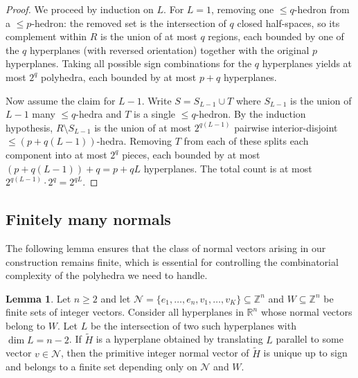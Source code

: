\documentclass{amsart}
\theoremstyle{definition}
\newtheorem{lemma}[theorem]{Lemma}
\begin{document}
\begin{proof}
We proceed by induction on $L$. For $L=1$, removing one $\leq\!\! q$-hedron
from a $\leq\!\! p$-hedron: the removed set is the intersection of $q$ closed
half-spaces, so its complement within $R$ is the union of at most $q$
regions, each bounded by one of the $q$ hyperplanes (with reversed
orientation) together with the original $p$ hyperplanes. Taking all
possible sign combinations for the $q$ hyperplanes yields at most $2^q$
polyhedra, each bounded by at most $p+q$ hyperplanes.

Now assume the claim for $L-1$. Write $S=S_{L-1}\cup T$ where $S_{L-1}$
is the union of $L-1$ many $\leq\!\! q$-hedra and $T$ is a single
$\leq\!\! q$-hedron. By the induction hypothesis, $R\setminus S_{L-1}$ is the
union of at most $2^{q(L-1)}$ pairwise interior-disjoint
$\leq\!\! (p+q(L-1))$-hedra. Removing $T$ from each of these splits each
component into at most $2^q$ pieces, each bounded by at most
$(p+q(L-1))+q=p+qL$ hyperplanes. The total count is at most
$2^{q(L-1)}\cdot 2^q=2^{qL}$.
\end{proof}

\subsection{Finitely many normals}

The following lemma ensures that the class of normal vectors arising in
our construction remains finite, which is essential for controlling the
combinatorial complexity of the polyhedra we need to handle.

\begin{lemma}\label{lem:finite_normals}
Let $n\geq 2$ and let
$\mathcal{N}=\{e_1,\dots,e_n, v_1,\dots,v_K\}\subseteq\mathbb{Z}^n$ and
$W\subseteq\mathbb{Z}^n$ be finite sets of integer vectors. Consider all hyperplanes in $\mathbb{R}^n$ whose normal vectors
belong to $W$. Let $L$ be the intersection of two such hyperplanes with
$\dim L=n-2$. If $\widetilde{H}$ is a hyperplane obtained by translating
$L$ parallel to some vector $v\in\mathcal{N}$, then the primitive integer
normal vector of $\widetilde{H}$ is unique up to sign and belongs to a
finite set depending only on $\mathcal{N}$ and $W$.
\end{lemma}
\end{document}
